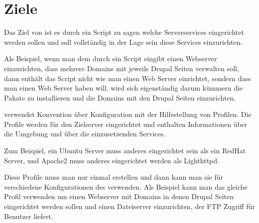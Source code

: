 \section{Ziele}

\begin{multicols}{2}

Das Ziel von \sscontrol{} ist es durch ein Script zu sagen welche Serverservices
eingerichtet werden sollen und \sscontrol{} soll vollständig in der Lage sein
diese Services einzurichten.

Als Beispiel, wenn man dem \sscontrol{} durch ein Script eingibt einen Webserver
einzurichten, dass mehrere Domains mit jeweils Drupal Seiten verwalten
soll, dann enthält das Script nicht wie man einen Web Server einrichtet,
sondern dass man einen Web Server haben will. \sscontrol{} wird sich
eigenständig darum kümmern die Pakate zu installieren und die Domains mit den
Drupal Seiten einzurichten.

\sscontrol{} verwendet Konvention über Konfiguration mit der Hilfestellung von
Profilen. Die Profile werden für den Zielserver eingerichtet und enthalten
Informationen über die Umgebung und über die einzusetzenden Services.

Zum Beispiel, ein Ubuntu Server muss anderes eingerichtet sein als ein RedHat
Server, und Apache2 muss anderes eingerichtet werden als Lighthttpd.

Diese Profile muss man nur einmal erstellen und dann kann man sie für
verschiedene Konfigurationen des \sscontrol{} verwenden. Als Beispiel kann man
das gleiche Profil verwenden um einen Webserver mit Domains in denen Drupal
Seiten eingerichtet werden sollen und einen Dateiserver einzurichten, der FTP
Zugriff für Benutzer liefert.

\end{multicols}
